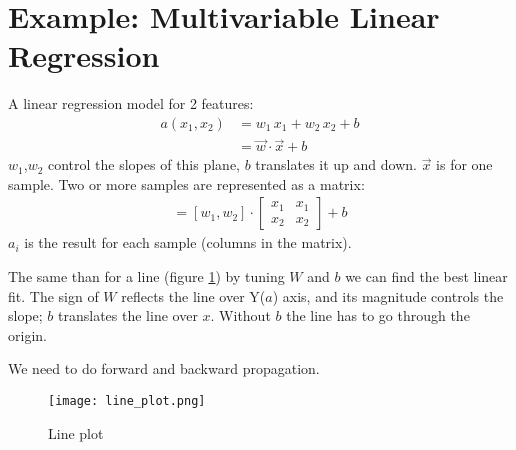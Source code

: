 \section{Example: Multivariable Linear Regression}
A linear regression model for 2 features:
\begin{align*}
  a(x_1, x_2) &= w_1\,x_1 + w_2\,x_2 + b \\
   &= \vec{w}\cdot\vec{x} + b
\end{align*}
$w_1$,$w_2$ control the slopes of this plane, $b$ translates it up and down. $\vec{x}$ is for one sample. Two or more samples are represented as a matrix:
\begin{align*}
[a_1, a_2] = 
  [w_1, w_2]\cdot{}
  \begin{bmatrix}
  x_1 & x_1\\
  x_2 & x_2 
  \end{bmatrix}
 +  b
\end{align*}
$a_i$ is the result for each sample (columns in the matrix).

The same than for a line (figure \ref{fig:line}) by tuning $W$ and $b$  we can find the best linear fit. The sign of $W$ reflects the line over Y($a$) axis, and its magnitude controls the slope; $b$ translates the line over $x$. Without $b$ the line has to go through the origin. 

We need to do forward and backward propagation.
\begin{figure}[h]
 \centering
 \texttt{[image: line\_plot.png]}
  \caption{Line plot} \label{fig:line}
\end{figure}


